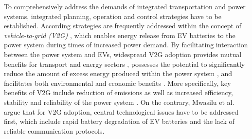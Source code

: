 To comprehensively address the demands of integrated transportation and power systems, integrated planning, operation and control strategies have to be established. According strategies are frequently addressed within the concept of \textit{vehicle-to-grid (V2G)} \cite{lund2008integration}, which enables energy release from EV batteries to the power system during times of increased power demand. By facilitating interaction between the power system and EVs, widespread V2G adoption provides mutual benefits for transport and energy sectors \cite{lund2006integrated}, possesses the potential to significantly reduce the amount of excess energy produced within the power system \cite{richardson2013electric}, and facilitates both environmental and economic benefits \cite{faria2012sustainability, mwasilu2014electric}. More specifically, key benefits of V2G include reduction of emissions as well as increased efficiency, stability and reliability of the power system \cite{yilmaz2013review}.
On the contrary, Mwasilu et al.~\cite{mwasilu2014electric} argue that for V2G adoption, central technological issues 
have to be addressed first, which include rapid battery degradation of EV batteries and the lack of reliable communication protocols.





%
